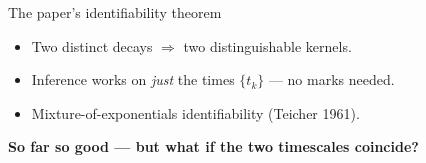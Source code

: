 \documentclass[aspectratio=169,11pt]{beamer}
\begin{document}
\begin{frame}{The paper's identifiability theorem}
  \vspace{0.4cm}

  \begin{center}
  \end{center}

  \vspace{0.5cm}

  \begin{itemize}
    \item Two distinct decays $\Rightarrow$ two distinguishable kernels.
    \item Inference works on \emph{just} the times $\{t_k\}$ --- no marks needed.
    \item \textcolor{soft}{Mixture-of-exponentials identifiability (Teicher 1961).}
  \end{itemize}

  \vspace{0.4cm}

  \centering\textcolor{accent}{\bfseries So far so good --- but what if the two timescales coincide?}
\end{frame}
\end{document}
